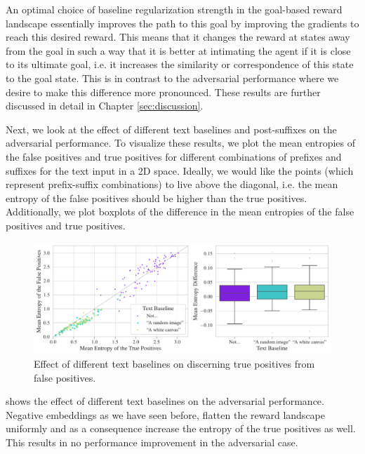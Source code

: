 An optimal choice of baseline regularization strength in the goal-based reward landscape essentially improves the path to this goal by improving the gradients to reach this desired reward.
This means that it changes the reward at states away from the goal in such a way that it is better at intimating the agent if it is close to its ultimate goal, i.e. it increases the similarity or correspondence of this state to the goal state.
This is in contrast to the adversarial performance where we desire to make this difference more pronounced.
These results are further discussed in detail in Chapter \ref{sec:discussion}.

Next, we look at the effect of different text baselines and post-suffixes on the adversarial performance.
To visualize these results, we plot the mean entropies of the false positives and true positives for different combinations of prefixes and suffixes for the text input in a 2D space.
Ideally, we would like the points (which represent prefix-suffix combinations) to live above the diagonal, i.e. the mean entropy of the false positives should be higher than the true positives.
Additionally, we plot boxplots of the difference in the mean entropies of the false positives and true positives.

\begin{figure}[H]
    \centering
    \includegraphics[width=\textwidth]{images/baseline_adversarial_2.pdf}
    \caption{Effect of different text baselines on discerning true positives from false positives.}
    \label{fig:baseline-adversarial}
\end{figure}

 shows the effect of different text baselines on the adversarial performance.
Negative embeddings as we have seen before, flatten the reward landscape uniformly and as a consequence increase the entropy of the true positives as well.
This results in no performance improvement in the adversarial case.

